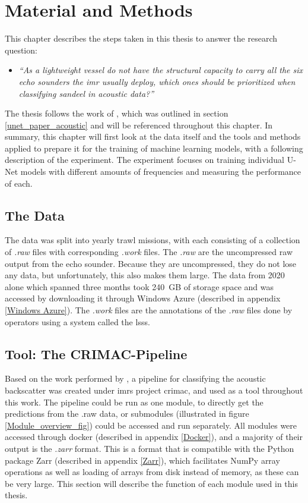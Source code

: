\chapter{Material and Methods} \label{methods}
    This chapter describes the steps taken in this thesis to answer the research question:
        \begin{itemize}
            \item \textit{“As a lightweight vessel do not have the structural capacity to carry all the six echo sounders the \gls{imr} usually deploy, which ones should be prioritized when classifying sandeel in acoustic data?”}
        \end{itemize}
    
    The thesis follows the work of \citeauthor{brautaset2020acoustic}\cite{brautaset2020acoustic}, which was outlined in section \ref{unet_paper_acoustic} and will be referenced throughout this chapter. In summary, this chapter will first look at the data itself and the tools and methods applied to prepare it for the training of machine learning models, with a following description of the experiment. The experiment focuses on training individual U-Net models with different amounts of frequencies and measuring the performance of each.
    
    \section{The Data}
        The data was split into yearly trawl missions, with each consisting of a collection of \textit{.raw} files with corresponding \textit{.work} files. The \textit{.raw} are the uncompressed raw output from the echo sounder. Because they are uncompressed, they do not lose any data, but unfortunately, this also makes them large. The data from 2020 alone which spanned three months took 240 GB of storage space and was accessed by downloading it through Windows Azure (described in appendix \ref{Windows Azure}). The \textit{.work} files are the annotations of the \textit{.raw} files done by operators using a system called the \Gls{lsss}\cite{lsss}. 
    
    \section{Tool: The CRIMAC-Pipeline}
        Based on the work performed by \citeauthor{brautaset2020acoustic}\cite{brautaset2020acoustic}, a pipeline for classifying the acoustic backscatter was created under \gls{imr}s project \gls{crimac}\cite{crimac_pipeline}, and used as a tool throughout this work. The pipeline could be run as one module, to directly get the predictions from the .raw data, or submodules (illustrated in figure \ref{Module_overview_fig}) could be accessed and run separately. All modules were accessed through docker (described in appendix \ref{Docker}), and a majority of their output is the \textit{.zarr} format. This is a format that is compatible with the Python package Zarr (described in appendix \ref{Zarr}), which facilitates NumPy array operations as well as loading of arrays from disk instead of memory, as these can be very large. This section will describe the function of each module used in this thesis.
        

